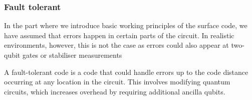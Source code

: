 \documentclass[final,5p,times,twocolumn,authoryear]{elsarticle}
\begin{document}
\subsubsection{Fault tolerant}
In the part where we introduce basic working principles of the surface code, we have assumed that errors happen in certain parts of the circuit. In realistic environments, however, this is not the case as errors could also appear at two-qubit gates or stabiliser measurements

A fault-tolerant code is a code that could handle errors up to the code distance occurring at any location in the circuit. This involves modifying quantum circuits, which increases overhead by requiring additional ancilla qubits.









\end{document}

